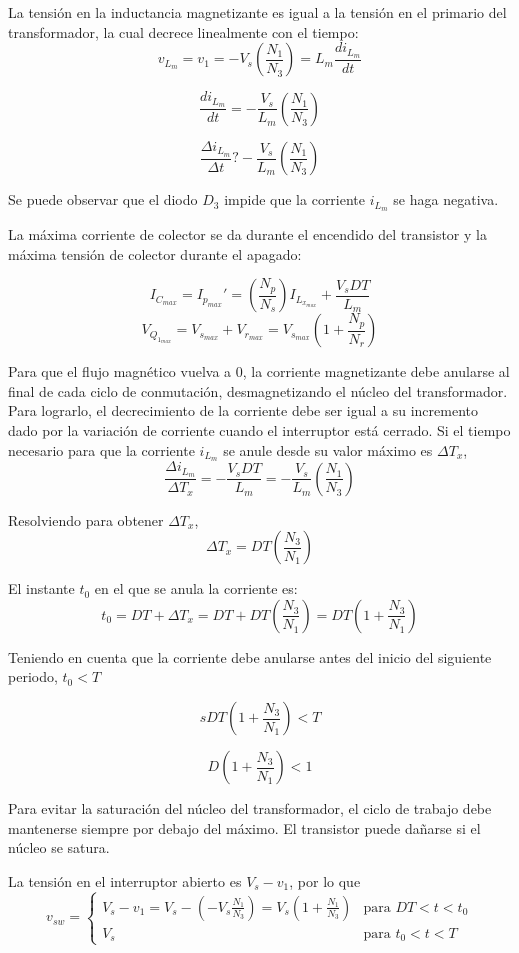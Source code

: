 La tensión en la inductancia magnetizante es igual a la tensión en el primario del transformador, la cual decrece linealmente con el tiempo:
$$ v_{L_m}=v_1=-V_s\left(\frac{N_1}{N_3}\right)=L_m\frac{di_{L_m}}{dt} $$

$$ \frac{di_{L_m}}{dt}=-\frac{V_s}{L_m}\left(\frac{N_1}{N_3}\right) $$

$$ \frac{\Delta i_{L_m}}{\Delta t}?-\frac{V_s}{L_m}\left(\frac{N_1}{N_3}\right) $$ 

Se puede observar que el diodo $D_3$ impide que la corriente $i_{L_m}$ se haga negativa. 

La máxima corriente de colector se da durante el encendido del transistor y la máxima tensión de colector durante el apagado:

$$ I_{C_{max}}=I_{p_{max}}'=\left(\frac{N_p}{N_s}\right)I_{L_{x_{max}}}+\frac{V_sDT}{L_m} $$
$$ V_{Q_{1_{max}}}=V_{s_{max}}+V_{r_{max}}=V_{s_{max}}\left(1+\frac{N_p}{N_r}\right) $$

Para que el flujo magnético vuelva a 0, la corriente magnetizante debe anularse al final de cada ciclo de conmutación, desmagnetizando el núcleo del transformador.
Para lograrlo, el decrecimiento de la corriente debe ser igual a su incremento dado por la variación de corriente cuando el interruptor está cerrado. 
Si el tiempo necesario para que la corriente $i_{L_m}$ se anule desde su valor máximo es $\Delta T_x$, 
$$ \frac{\Delta i_{L_m}}{\Delta T_x}=-\frac{V_sDT}{L_m}=-\frac{V_s}{L_m}\left(\frac{N_1}{N_3}\right) $$

Resolviendo para obtener $\Delta T_x$,
$$ \Delta T_x=DT\left(\frac{N_3}{N_1}\right) $$

El instante $t_0$ en el que se anula la corriente es:
$$ t_0=DT+\Delta T_x=DT+DT\left(\frac{N_3}{N_1}\right)=DT\left(1+\frac{N_3}{N_1}\right) $$

Teniendo en cuenta que la corriente debe anularse antes del inicio del siguiente periodo,
$t_0<T$

$$ sDT\left(1+\frac{N_3}{N_1}\right)<T $$

$$ D\left(1+\frac{N_3}{N_1}\right)<1 $$

Para evitar la saturación del núcleo del transformador, el ciclo de trabajo debe mantenerse siempre por debajo del máximo.
El transistor puede dañarse si el núcleo se satura.

La tensión en el interruptor abierto es $V_s-v_1$, por lo que
$$
v_{sw}=
\begin{cases}
    V_s-v_1=V_s-\left(-V_s\frac{N_1}{N_3}\right)=V_s\left(1+\frac{N_1}{N_3}\right) & \text{para $DT<t<t_0$}\\
    V_s & \text{para $t_0<t<T$}
\end{cases}
$$

